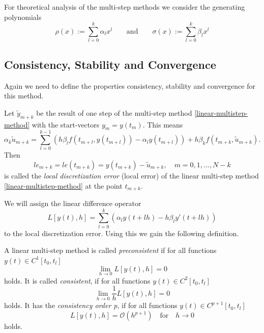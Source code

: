 	For theoretical analysis of the multi-step methods we consider the generating polynomials
	\begin{equation}
		\rho(x) := \sum_{l=0}^{k} \alpha_l x^l
		\qquad \text{and} \qquad
		\sigma(x) := \sum_{l=0}^{k} \beta_l x^l
	\end{equation}
	
		
	
	\subsection{Consistency, Stability and Convergence}
	\cite{NumerikGewöhnlicherDifferentialgleichungen}
	
	Again we need to define the properties consistency, stability and convergence for this method.
	\begin{definition}
		Let $\tilde{y}_{m+k}$ be the result of one step of the multi-step method \ref{linear-multistep-method} with the start-vectors $y_m = y(t_m)$. This means
		\begin{displaymath}
			\alpha_k \tilde{u}_{m+k} = \sum_{l=0}^{k-1} \left( h \beta_l f(t_{m+l}, y(t_{m+l})) - \alpha_l y(t_{m+l}) \right) + h \beta_k f(t_{m+k}, \tilde{u}_{m+k}) .
		\end{displaymath}
		Then
		\begin{displaymath}
			le_{m+k} = le(t_{m+k}) = y(t_{m+k}) - \tilde{u}_{m+k}, \quad m=0,1,...,N-k
		\end{displaymath}
		is called the \emph{local discretization error} (local error) of the linear multi-step method \ref{linear-multistep-method} at the point $t_{m+k}$.
	\end{definition}
	
	We will assign the linear difference operator
	\begin{equation}
		L[y(t),h] = \sum_{l=0}^{k} \left( \alpha_l y(t+lh) - h \beta_l y'(t+lh) \right)
	\end{equation}
	to the local discretization error. Using this we gain the following definition.

	\begin{definition}
		A linear multi-step method is called \emph{preconsistent} if for all functions $y(t) \in C^1[t_0,t_l]$
		\begin{displaymath}
			\lim\limits_{h \to 0} L[y(t),h]=0
		\end{displaymath}
		holds. It is called \emph{consistent}, if for all functions $y(t) \in C^2[t_0,t_l]$
		\begin{displaymath}
			\lim\limits_{h \to 0} \frac{1}{h} L[y(t),h] = 0
		\end{displaymath}
		holds. It has the \emph{consistency order p}, if for all functions $y(t) \in C^{p+1}[t_0, t_l]$
		\begin{displaymath}
			L[y(t),h] = \mathcal{O}(h^{p+1}) \quad \text{for} \quad h \to 0
		\end{displaymath}
		holds.
	\end{definition}

